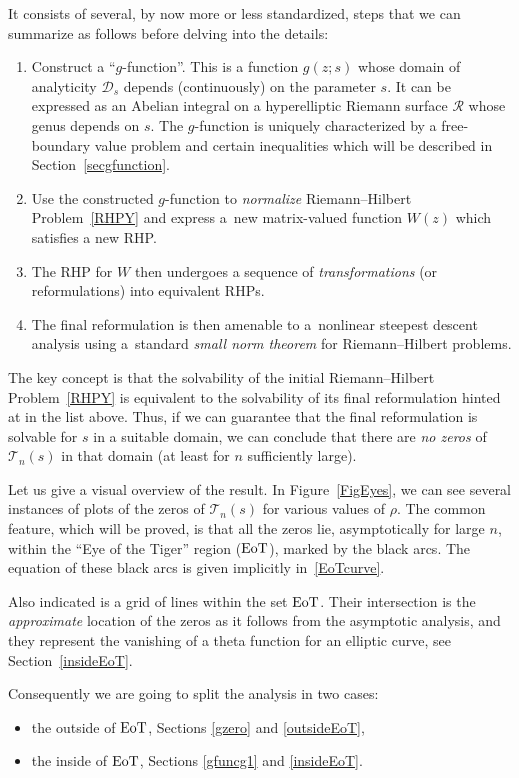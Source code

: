\documentclass[pdftex]{sigma}
\numberwithin{equation}{section}
\theoremstyle{definition}
\def \scr{\mathscr}
\begin{document}
It consists of several, by now more or less standardized, steps that we can summarize as follows before delving into the details:
\begin{enumerate}\itemsep=0pt
\item[(1)] Construct a ``$g$-function''. This is a function $g(z;s)$ whose domain of analyticity $\scr D_s$ depends (continuously) on the parameter $s$. It can be expressed as an Abelian integral on a hyperelliptic Riemann surface $\mathcal R$ whose genus depends on $s$. The $g$-function is uniquely characterized by a free-boundary value problem and certain inequalities which will be described in Section~\ref{secgfunction}.
\item[(2)] Use the constructed $g$-function to {\it normalize} Riemann--Hilbert Problem~\ref{RHPY} and express a~new matrix-valued function $W(z)$ which satisfies a new RHP.
\item[(3)] The RHP for $W$ then undergoes a sequence of {\it transformations} (or reformulations) into equivalent RHPs.
\item[(4)] The final reformulation is then amenable to a~nonlinear steepest descent analysis using a~standard {\it small norm theorem} for Riemann--Hilbert problems.
\end{enumerate}
The key concept is that the solvability of the initial Riemann--Hilbert Problem~\ref{RHPY} is equivalent to the solvability of its final reformulation hinted at in the list above.
Thus, if we can guarantee that the final reformulation is solvable for $s$ in a suitable domain, we can conclude that there are {\it no zeros} of~$\mathcal T_n(s)$ in that domain (at least for $n$ sufficiently large).

Let us give a visual overview of the result. In Figure~\ref{FigEyes}, we can see several instances of plots of the zeros of $\mathcal T_n(s)$ for various values of ${ {\rho}}$. The common feature, which will be proved, is that all the zeros lie, asymptotically for large $n$, within the ``Eye of the Tiger'' region (${\rm EoT}$), marked by the black arcs. The equation of these black arcs is given implicitly in~\eqref{EoTcurve}.

Also indicated is a grid of lines within the set ${\rm EoT}$. Their intersection is the {\it approximate} location of the zeros as it follows from the asymptotic analysis, and they represent the vanishing of a theta function for an elliptic curve, see Section~\ref{insideEoT}.

Consequently we are going to split the analysis in two cases:
\begin{itemize}\itemsep=0pt
\item the outside of ${\rm EoT}$, Sections \ref{gzero} and \ref{outsideEoT},
\item the inside of ${\rm EoT}$, Sections \ref{gfuncg1} and \ref{insideEoT}.
\end{itemize}
\end{document}
